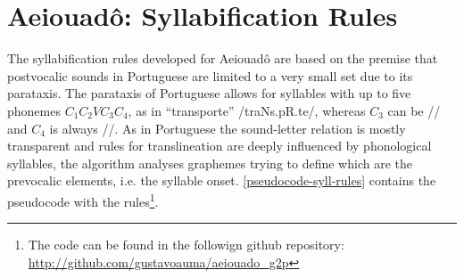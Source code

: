 \chapter{Aeiouad\^o: Syllabification Rules} 

The syllabification rules developed for Aeiouad\^o are based on the premise that postvocalic sounds in Portuguese are limited to a very small set due to its parataxis. The parataxis of Portuguese allows for syllables with up to five phonemes $C_1C_2VC_3C_4$, as in ``transporte'' /traNs.pR.te/, whereas $C_3$ can be // and $C_4$ is always //. As in Portuguese the sound-letter relation is mostly transparent and rules for translineation are deeply influenced by phonological syllables, the algorithm analyses graphemes trying to define which are the prevocalic elements, i.e. the syllable onset. \autoref{pseudocode-syll-rules} contains the pseudocode with the rules\footnote{The code can be found in the followign github repository: \url{http://github.com/gustavoauma/aeiouado_g2p}}.


